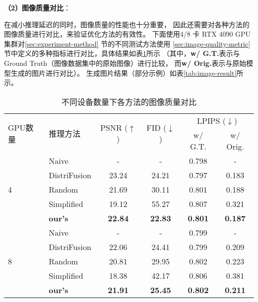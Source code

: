 \par
\textbf{（2）图像质量对比}：
\par
在减小推理延迟的同时，图像质量的性能也十分重要，
因此还需要对各种方法的图像质量进行对比，来验证优化方法的有效性。
下面使用4/8 卡 RTX 4090 GPU集群对\ref{sec:experiment-method} 节的不同测试方法使用
\ref{sec:image-quality-metric} 节中定义的多种指标进行对比，具体结果如表\ref{tab:image-quality-result}所示
（其中，\textbf{w/ G.T.}表示与Ground Truth（图像数据集中的原始图像）进行比较，
而\textbf{w/ Orig.}表示与原始模型生成的图片进行对比）。
生成图片结果（部分示例）如表\ref{tab:image-result}所示。
\begin{table}[ht]
    \centering
    \begin{tabular}{l l c c c c}
    \toprule
    \multirow{2}{*}{GPU数量} & \multirow{2}{*}{推理方法} & \multirow{2}{*}{PSNR ($\uparrow$)} & \multirow{2}{*}{FID ($\downarrow$)} & \multicolumn{2}{c}{LPIPS ($\downarrow$)} \\
    \cmidrule(lr){5-6}
    & & & & w/ G.T. & w/ Orig. \\
    \midrule
    
    \multirow{5}{*}{4}
    & Naive & - & - & 0.798 & - \\
    \cmidrule(lr){2-6}
    & DistriFusion & 23.24 & 24.21 & 0.797 & 0.183 \\
    \cmidrule(lr){2-6}
    & Random & 21.69 & 30.11 & 0.801 & 0.188 \\
    \cmidrule(lr){2-6}
    & Simplified & 19.12 & 55.27 & 0.807 & 0.321 \\
    \cmidrule(lr){2-6}
    & \textbf{our's} & \textbf{22.84} & \textbf{22.83} & \textbf{0.801} & \textbf{0.187} \\
    \midrule
    
    \multirow{5}{*}{8}
    & Naive & - & - & 0.799 & - \\
    \cmidrule(lr){2-6}
    & DistriFusion & 22.06 & 24.41 & 0.799 & 0.209 \\
    \cmidrule(lr){2-6}
    & Random & 20.81 & 29.95 & 0.802 & 0.223 \\
    \cmidrule(lr){2-6}
    & Simplified & 18.38 & 42.17 & 0.806 & 0.381 \\
    \cmidrule(lr){2-6}
    & \textbf{our's} & \textbf{21.91} & \textbf{25.45} & \textbf{0.802} & \textbf{0.211} \\
    \bottomrule
    \end{tabular}
    \caption{不同设备数量下各方法的图像质量对比}
    \label{tab:image-quality-result}
\end{table}

